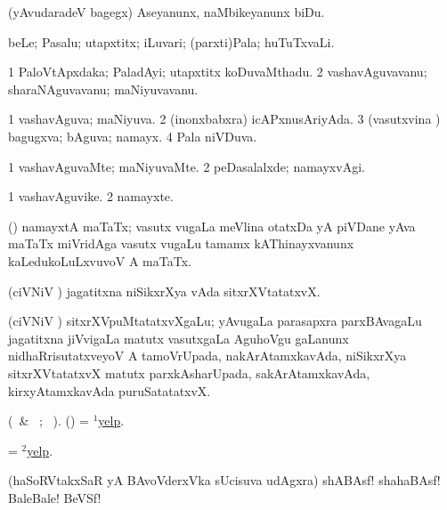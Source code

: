  (yAvudaradeV bagegx) Aseyanunx, naMbikeyanunx biDu.
\eanum
\numie
\enum
\emng
\eentry

\bentry
{} 
\gl{\nA} 
\bmng
beLe; Pasalu; utapxtitx; iLuvari; (parxti)Pala; huTuTxvaLi.
\emng
\eentry

\bentry
{} 
\gl{\nA} 
\bmng
\bnum
\num{1} PaloVtApxdaka; PaladAyi; utapxtitx koDuvaMthadu. 
\num{2} vashavAguvavanu; sharaNAguvavanu; maNiyuvavanu.
\enum
\emng
\eentry

\bentry
{} 
\gl{\gu} 
\bmng
\bnum
\num{1} vashavAguva; maNiyuva. 
\num{2} (inonxbabxra) icAPxnusAriyAda. 
\num{3} (vasutxvina \vi) bagugxva; bAguva; namayx. 
\num{4} Pala niVDuva.
\enum
\emng
\eentry

\bentry
{} 
\gl{\kirxvi} 
\bmng
\bnum
\num{1} vashavAguvaMte; maNiyuvaMte. 
\num{2} peDasalalxde; namayxvAgi.
\enum
\emng
\eentry

\bentry
{} 
\gl{\nA} 
\bmng
\bnum
\num{1} vashavAguvike. 
\num{2} namayxte.
\enum
\emng
\eentry

\bentry
{}
\gl{\nA} 
\bmng
(\Bwvi) namayxtA maTaTx; vasutx \mo vugaLa meVlina otatxDa yA piVDane yAva maTaTx miVridAga vasutx \mo vugaLu tamamx kAThinayxvanunx kaLedukoLuLxvuvoV A maTaTx.
\emng
\eentry

\bentry
{} 
\gl{\nA} 
\bmng
(ciVNiV \tashA) jagatitxna niSikxrXya vAda sitxrXVtatatxvX.
\emng
\eentry

\bentry
{}
\gl{\nA}
\bmng
(ciVNiV \tashA) sitxrXVpuMtatatxvXgaLu; yAvugaLa parasapxra parxBAvagaLu jagatitxna jiVvigaLa matutx vasutxgaLa AguhoVgu gaLanunx nidhaRrisutatxveyoV A tamoVrUpada, 	nakArAtamxkavAda, niSikxrXya sitxrXVtatatxvX matutx parxkAsharUpada, sakArAtamxkavAda, kirxyAtamxkavAda puruSatatatxvX. \quad {}
\emng
\eentry

\bentry
{} 
\gl{\akirx} 
\bmng
(\BU\ \& \BUkaq\ ; \vakaq\ ). 
(\ame) = \hyperlink{yelp(1)}{$^1$yelp}.
\emng
\eentry

\bentry
{} 
\gl{\nA} 
\bmng
= \hyperlink{yelp(2)}{$^2$yelp}.
\emng
\eentry

\bentry
{} 
\gl{\BAavayx} 
\bmng
(haSoRVtakxSaR yA BAvoVderxVka sUcisuva udAgxra) shABAsf! shahaBAsf! BaleBale! BeVSf! 
\emng
\eentry


